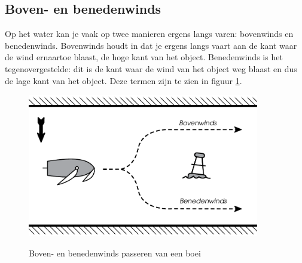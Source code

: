 \subsection{Boven- en benedenwinds}
Op het water kan je vaak op twee manieren ergens langs varen: bovenwinds en benedenwinds. Bovenwinds houdt in dat je ergens langs vaart aan de kant waar de wind ernaartoe blaast, de hoge kant van het object. Benedenwinds is het tegenovergestelde: dit is de kant waar de wind van het object weg blaast en dus de lage kant van het object. Deze termen zijn te zien in figuur \ref{pic:boven_benedenwinds}.
\begin{figure}[h]
  \centering
  \begin{minipage}[b]{0.7\textwidth}
   \centering
    \includegraphics[width=0.9\textwidth]{Hoofdstukken/Onderdelen/pdf/boven_en_benedenwinds.pdf}
    \caption{Boven- en benedenwinds passeren van een boei}
    \centering
    \label{pic:boven_benedenwinds}
  \end{minipage}
  \hfill
  \begin{minipage}[b]{0.29\textwidth}
    \centering

\end{minipage}
\end{figure}
